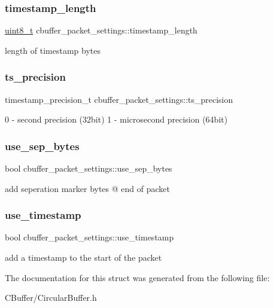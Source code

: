 \subsubsection{\texorpdfstring{timestamp\+\_\+length}{timestamp\_length}}
{\footnotesize\ttfamily \hyperlink{vl53l0x__types_8h_aba7bc1797add20fe3efdf37ced1182c5}{uint8\+\_\+t} cbuffer\+\_\+packet\+\_\+settings\+::timestamp\+\_\+length}

length of timestamp bytes \mbox{\label{structcbuffer__packet__settings_a14a94ea11d0ad1145e3826cc08af8d49}} 
\subsubsection{\texorpdfstring{ts\+\_\+precision}{ts\_precision}}
{\footnotesize\ttfamily timestamp\+\_\+precision\+\_\+t cbuffer\+\_\+packet\+\_\+settings\+::ts\+\_\+precision}

0 -\/ second precision (32bit) 1 -\/ microsecond precision (64bit) \mbox{\label{structcbuffer__packet__settings_a526b8c6eea467c865d12d3073c6fd7de}} 
\subsubsection{\texorpdfstring{use\+\_\+sep\+\_\+bytes}{use\_sep\_bytes}}
{\footnotesize\ttfamily bool cbuffer\+\_\+packet\+\_\+settings\+::use\+\_\+sep\+\_\+bytes}

add seperation marker bytes @ end of packet \mbox{\label{structcbuffer__packet__settings_ae1f27c64de7c208607ddba469e702ccb}} 
\subsubsection{\texorpdfstring{use\+\_\+timestamp}{use\_timestamp}}
{\footnotesize\ttfamily bool cbuffer\+\_\+packet\+\_\+settings\+::use\+\_\+timestamp}

add a timestamp to the start of the packet 

The documentation for this struct was generated from the following file\+:\begin{DoxyCompactItemize}
\item 
C\+Buffer/Circular\+Buffer.\+h\end{DoxyCompactItemize}
